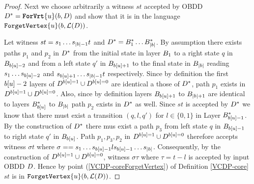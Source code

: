\begin{proof}
    Next we choose arbitrarily a witness $st$ accepted by OBDD $D^* = \texttt{\textbf{ForVrt}}\{u\}(b,D)$ and show that it is in the language $\texttt{ForgetVertex}\{u\}(b,\mathcal{L}(D))$. 


    Let witness $st = s_1\dots s_{|b|-1}t$ and $D^* = B_1^*\dots B_{|b|}^*$. 
    By assumption there exists paths $p_1$ and $p_2$ in $D^*$ from the initial state in layer $B_1$ to a right state $q$ in $B_{b[u]-2}$ and from a left state $q'$ in $B_{b[u]+1}$ to the final state in $B_{|b|}$ reading $s_1\dots s_{b[u]-2}$ and $ s_{b[u]+1}\dots s_{|b|-1}t$ respectively. Since by definition the first $b[u]-2$ layers of $D^{b[u]=1}\cup D^{b[u]=0}$ are identical a those of $D^*$, path $p_1$ exists in $D^{b[u]=1}\cup D^{b[u]=0}$. Also, since by definition layers $B_{b[u]+1}$ to $B_{|b|+1}$ are identical to layers $B_{b[u]}^*$ to $B_{|b|}$ path $p_2$ exists in $D^*$ as well. Since $st$ is accepted by $D^*$ we know that there must exist a transition $(q, l, q')$ for $l\in \{0,1\}$ in Layer $B_{b[u]-1}^*$. By the construction of $D^*$ there mus exist a path $p_3$ from left state $q$ in $B_{b[u]-1}$ to right state $q'$ in $B_{b[u]}$. Path $p_1, p_3, p_2$ in $D^{b[u]=1}\cup D^{b[u]=0}$ therefore accepts witness $\sigma t $ where $\sigma = = s_1\dots s_{b[u]-1}l s_{b[u]-1}\dots s_{|b|}$. Consequently, by the construction of $D^{b[u]=1}\cup D^{b[u]=0}$, witness $\sigma\tau$ where $\tau = t-l$ is accepted by input OBDD $D$. Hence by point (\ref{VCDP-coreForgetVertex}) of Definition \ref{VCDP-core} $st$ is in $\texttt{ForgetVertex}\{u\}(b,\mathcal{L}(D))$.

\end{proof}
